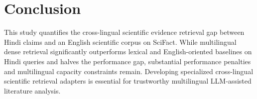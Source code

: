 \documentclass[11pt,a4paper]{article}
\begin{document}
\section{Conclusion}
This study quantifies the cross-lingual scientific evidence retrieval gap between Hindi claims and an English scientific corpus on SciFact. While multilingual dense retrieval significantly outperforms lexical and English-oriented baselines on Hindi queries and halves the performance gap, substantial performance penalties and multilingual capacity constraints remain. Developing specialized cross-lingual scientific retrieval adapters is essential for trustworthy multilingual LLM-assisted literature analysis.



\end{document}
